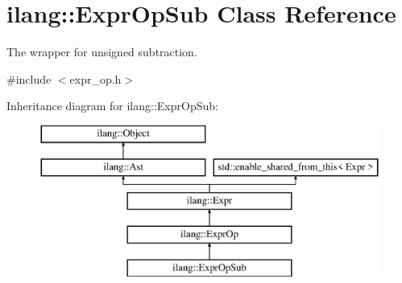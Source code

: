\hypertarget{classilang_1_1_expr_op_sub}{}\section{ilang\+:\+:Expr\+Op\+Sub Class Reference}
\label{classilang_1_1_expr_op_sub}


The wrapper for unsigned subtraction.  




{\ttfamily \#include $<$expr\+\_\+op.\+h$>$}

Inheritance diagram for ilang\+:\+:Expr\+Op\+Sub\+:\begin{figure}[H]
\begin{center}
\leavevmode
\includegraphics[height=5.000000cm]{classilang_1_1_expr_op_sub}
\end{center}
\end{figure}
